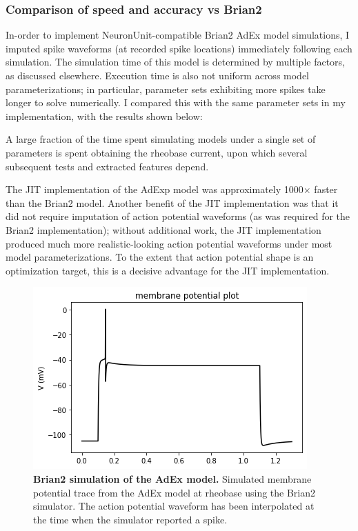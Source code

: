 \subsubsection{Comparison of speed and accuracy vs Brian2}
In-order to implement NeuronUnit-compatible Brian2 AdEx model simulations, I imputed spike waveforms (at recorded spike locations) immediately following each simulation.
The simulation time of this model is determined by multiple factors, as discussed elsewhere. Execution time is also not uniform across model parameterizations; in particular, parameter sets exhibiting more spikes take longer to solve numerically.
I compared this with the same parameter sets in my implementation, with the results shown below:

A large fraction of the time spent simulating models under a single set of parameters is spent obtaining the rheobase current, upon which several subsequent tests and extracted features depend.

The JIT implementation of the AdExp model was approximately 1000$\times$ faster than the Brian2 model.
Another benefit of the JIT implementation was that it did not require imputation of action potential waveforms (as was required for the Brian2 implementation); without additional work, the JIT implementation produced much more realistic-looking action potential waveforms under most model parameterizations.
To the extent that action potential shape is an optimization target, this is a decisive advantage for the JIT implementation.

\begin{figure}[!htb]
\begin{center}
\includegraphics[scale=0.7]{figures/backend_check_files/backend_check_12_10.png}
\caption[Brian2 simulation of the AdEx model]{\textbf{Brian2 simulation of the AdEx model.} Simulated membrane potential trace from the AdEx model at rheobase using the Brian2 simulator. The action potential waveform has been interpolated at the time when the simulator reported a spike.}
\label{fig:AdEx-Brian2-sim}
\end{center}
\end{figure}

